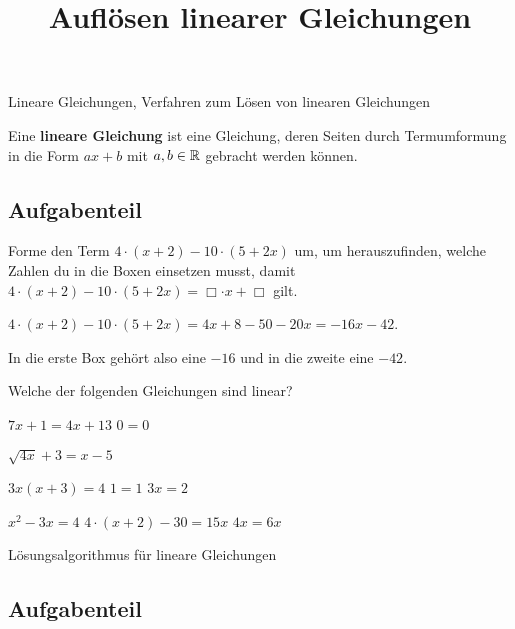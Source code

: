 \documentclass[solution]{uebungsblatt}
\title{Auflösen linearer Gleichungen}
\begin{document}
\maketitle
\begin{contents}
    Lineare Gleichungen, Verfahren zum Lösen von linearen Gleichungen
\end{contents}


\begin{definition}
    Eine \textbf{lineare Gleichung} ist eine Gleichung, deren Seiten durch Termumformung in die Form $ax+b$ mit $a,b\in\mathbb{R}$ gebracht werden können.
\end{definition}

\subsection*{Aufgabenteil}

\begin{exercise}
    Forme den Term $4\cdot (x+2)-10\cdot (5+2x)$ um, um herauszufinden, welche Zahlen du in die Boxen einsetzen musst, damit $4\cdot (x+2)-10\cdot (5+2x)=\Box\cdot x+\Box$ gilt.
    \begin{answerbox}[.5in]
        $4\cdot (x+2)-10\cdot (5+2x)=4x+8-50-20x=-16x-42$. 
        
        In die erste Box gehört also eine $-16$ und in die zweite eine $-42$.
    \end{answerbox}
\end{exercise}

\begin{exercise}
    Welche der folgenden Gleichungen sind linear?
    \begin{multicols}{3}
        \begin{multiplechoice}
            \citem $7x+1=4x+13$
            \citem $0=0$
            \item $\sqrt{4x}+3=x-5$
            \item $3x(x+3)=4$
            \citem $1=1$
            \citem $3x=2$
            \item $x^2-3x=4$
            \citem $4\cdot (x+2)-30=15x$
            \citem $4x=6x$
        \end{multiplechoice}
    \end{multicols}
\end{exercise}

\newpage


\begin{remark}
    Lösungsalgorithmus für lineare Gleichungen
\end{remark}

\subsection*{Aufgabenteil}

\end{document}
